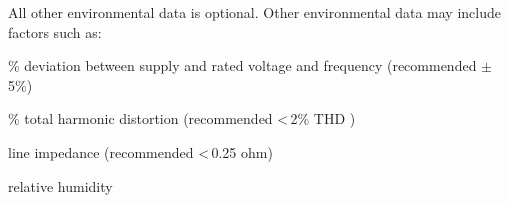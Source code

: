 All other environmental data is optional.
Other environmental data may include factors such as:

\begin{packed_item}
\item[{-}]
\% deviation between supply and rated voltage and frequency (recommended $\pm$\,5\%)
\item[{-}]
\% total harmonic distortion (recommended \textless\,2\% THD )
\item[{-}]
line impedance (recommended \textless\,0.25 ohm)
\item[{-}]
relative humidity
\end{packed_item}

